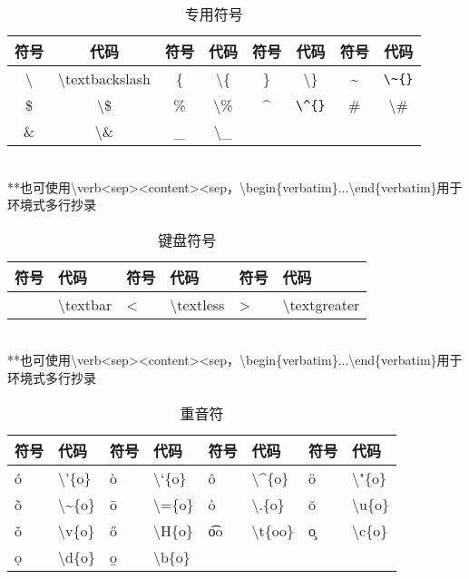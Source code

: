 \documentclass[UTF8,fontset=ubuntu]{ctexart}
\begin{document}
\begin{table}[H]
\begin{tabular}{c c c c c c c c}
	\hline
	符号 & 代码 & 符号 & 代码 & 符号 & 代码 & 符号 & 代码\\
	\hline
	\textbackslash & \textbackslash textbackslash & \{ & \textbackslash\{ & \} & \textbackslash\} & \~{} & \verb|\~{}|\\
	\$ & \textbackslash\$ & \% & \textbackslash\% & \^{} & \verb|\^{}| & \# & \textbackslash\#\\
	\& & \textbackslash\& & \_ & \textbackslash\_\\
	\hline
\end{tabular}\\[2mm]
\RaggedRight
**也可使用\textbackslash verb\textless sep\textgreater\textless content\textgreater\textless sep，\textbackslash begin\{verbatim\}...\textbackslash end\{verbatim\}用于环境式多行抄录\\
\caption{专用符号}
\end{table}

\begin{table}[H]
\begin{tabular}{l l l l l l}
	\hline
	符号 & 代码 & 符号 & 代码 & 符号 & 代码\\
	\hline
	\textbar & \textbackslash textbar & \textless & \textbackslash textless & \textgreater & \textbackslash textgreater\\
	\hline
\end{tabular}\\[2mm]
\RaggedRight
**也可使用\textbackslash verb\textless sep\textgreater\textless content\textgreater\textless sep，\textbackslash begin\{verbatim\}...\textbackslash end\{verbatim\}用于环境式多行抄录\\
\caption{键盘符号}
\end{table}

\begin{table}[H]
\begin{tabular}{l l l l l l l l}
	\hline
	符号 & 代码 & 符号 & 代码 & 符号 & 代码 & 符号 & 代码\\
	\hline
	\'{o} & \textbackslash'\{o\} & \`{o} & \textbackslash`\{o\} & \^{o} & \textbackslash\^{}\{o\} & \"{o} & \textbackslash"\{o\}\\
	\~{o} & \textbackslash\~{}\{o\} & \={o} & \textbackslash=\{o\} & \.{o} & \textbackslash.\{o\} & \u{o} & \textbackslash u\{o\}\\
	\v{o} & \textbackslash v\{o\} & \H{o} & \textbackslash H\{o\} & \t{oo} & \textbackslash t\{oo\} & \c{o} & \textbackslash c\{o\}\\
	\d{o} & \textbackslash d\{o\} & \b{o} & \textbackslash b\{o\}\\
	\hline
\end{tabular}
\caption{重音符}
\end{table}
\end{document}
